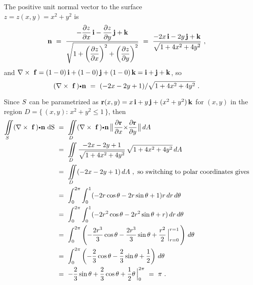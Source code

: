 \begin{solu} The positive unit normal vector to the surface\\$z=z(x,y)=x^2 + y^2$ is
 \begin{displaymath}
  \mathbf{ n} ~=~
   \dfrac{-\dfrac{\partial z}{\partial x}\,\mathbf{ i} - \dfrac{\partial z}{\partial y}\,\mathbf{ j} +
   \mathbf{ k}}{\sqrt{1 + \left( \dfrac{\partial z}{\partial x} \right)^2 +
   \left( \dfrac{\partial z}{\partial y} \right)^2}} ~=~
   \dfrac{-2x\,\mathbf{ i} - 2y\,\mathbf{ j} + \mathbf{ k}}{\sqrt{1 + 4x^2 + 4y^2}} ~,
 \end{displaymath}
 and $\nabla \times~\mathbf{ f}= (1-0)\,\mathbf{ i}+(1-0)\,\mathbf{ j}+(1-0)\,\mathbf{ k} = \mathbf{ i}+\mathbf{ j}+\mathbf{ k}$,
 so
 \begin{displaymath}
  \Dotprod{(\curlb~{\vector{f}}\,)}{\vector{n}} ~=~ (-2x-2y+1)/\sqrt{1 + 4x^2 + 4y^2} ~.
 \end{displaymath}

 \par\noindent
 Since $S$ can be parametrized as $\mathbf{ r}(x,y) = x\,\mathbf{ i}+y\,\mathbf{ j}+(x^2 + y^2 )\,\mathbf{ k}$ for
 $(x,y)$ in the region $D = \lbrace \, (x,y):\,x^2 + y^2 \le 1 \,\rbrace$, then
 \begin{align*}
  \diint\limits_{\superficie} \Dotprod{(\curlb~{\vector{f}}\,)}{\vector{n}}\, \d \S ~&=~
   \diint\limits_{D} \Dotprod{(\curlb~{\vector{f}}\,)}{\vector{n}}\,
  \Norm{\Crossprod{\dfrac{\partial \vector{r}}{\partial x}}{\dfrac{\partial \vector{r}}{\partial y}}}\,dA\\
   &=~ \diint\limits_{D} \dfrac{-2x-2y+1}{\sqrt{1 + 4x^2 + 4y^2}}\,\sqrt{1 + 4x^2 + 4y^2}\,dA\\
   &=~ \diint\limits_{D} (-2x-2y+1)\,dA ~,~\text{so switching to polar coordinates gives}\\
   &=~ \dint_0^{2\pi} \dint_0^1 (-2r\cos \theta - 2r\sin \theta + 1)r\,dr\,d\theta\\
   &=~ \dint_0^{2\pi} \dint_0^1 (-2r^2 \cos \theta - 2r^2 \sin \theta + r)\,dr\,d\theta\\
   &=~ \dint_0^{2\pi} \left( -\dfrac{2r^3}{3} \cos \theta - \dfrac{2r^3}{3} \sin \theta +
   \dfrac{r^2}{2}\,\Big|_{r=0}^{r=1} \,\right)\,d\theta\\
   &=~ \dint_0^{2\pi} \left( -\dfrac{2}{3} \cos \theta - \dfrac{2}{3} \sin \theta + \dfrac{1}{2} \right)\,d\theta\\
   &=~ -\dfrac{2}{3} \sin \theta + \dfrac{2}{3} \cos \theta + \dfrac{1}{2}\theta\,\Big|_0^{2\pi} ~=~ \pi ~.
 \end{align*}


\end{solu}
